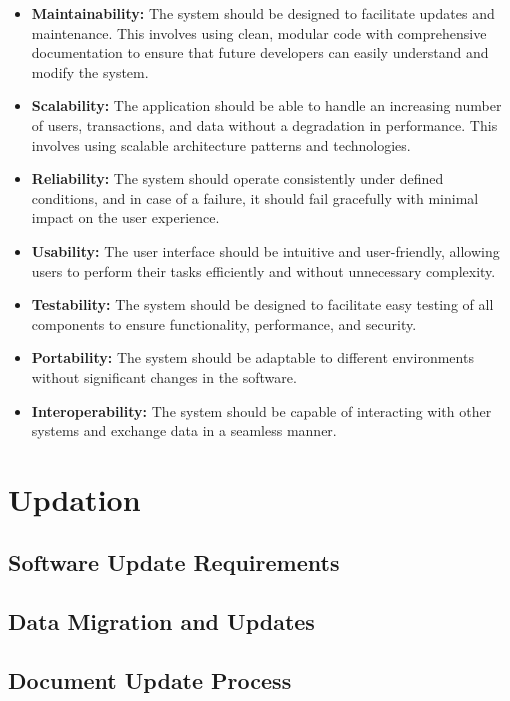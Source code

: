 \documentclass{article}
\begin{document}
\vspace{1em}

\begin{itemize}
    \item \textbf{Maintainability:} The system should be designed to facilitate updates and maintenance. This involves using clean, modular code with comprehensive documentation to ensure that future developers can easily understand and modify the system.

    \item \textbf{Scalability:} The application should be able to handle an increasing number of users, transactions, and data without a degradation in performance. This involves using scalable architecture patterns and technologies.

    \item \textbf{Reliability:} The system should operate consistently under defined conditions, and in case of a failure, it should fail gracefully with minimal impact on the user experience.

    \item \textbf{Usability:} The user interface should be intuitive and user-friendly, allowing users to perform their tasks efficiently and without unnecessary complexity.

    \item \textbf{Testability:} The system should be designed to facilitate easy testing of all components to ensure functionality, performance, and security.

    \item \textbf{Portability:} The system should be adaptable to different environments without significant changes in the software.

    \item \textbf{Interoperability:} The system should be capable of interacting with other systems and exchange data in a seamless manner.
\end{itemize}

\newpage
\section{Updation}
\subsection{Software Update Requirements}

\subsection{Data Migration and Updates}

\subsection{Document Update Process}
\end{document}
